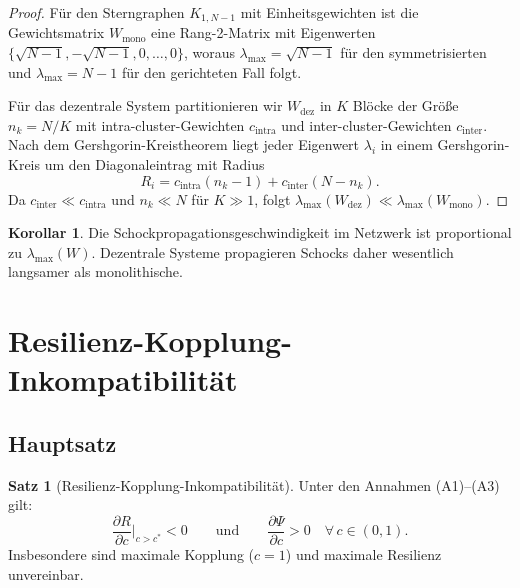 \documentclass[a4paper, 12pt, twoside, openright]{report}
\theoremstyle{definition}
\theoremstyle{definition}
\newtheorem{satz}{Satz}[chapter]
\newtheorem{korollar}{Korollar}[chapter]
\begin{document}
\begin{proof}
    Für den Sterngraphen $K_{1,N-1}$ mit Einheitsgewichten ist die Gewichtsmatrix
    $W_{\text{mono}}$ eine Rang-2-Matrix mit Eigenwerten
    $\{\sqrt{N-1}, -\sqrt{N-1}, 0, \ldots, 0\}$, woraus $\lambda_{\max} = \sqrt{N-1}$
    für den symmetrisierten und $\lambda_{\max} = N-1$ für den gerichteten Fall folgt.
    
    Für das dezentrale System partitionieren wir $W_{\text{dez}}$ in $K$ Blöcke der Größe
    $n_k = N/K$ mit intra-cluster-Gewichten $c_{\text{intra}}$ und inter-cluster-Gewichten
    $c_{\text{inter}}$. Nach dem Gershgorin-Kreistheorem liegt jeder Eigenwert $\lambda_i$
    in einem Gershgorin-Kreis um den Diagonaleintrag mit Radius
    \[
        R_i = c_{\text{intra}}(n_k - 1) + c_{\text{inter}}(N - n_k).
    \]
    Da $c_{\text{inter}} \ll c_{\text{intra}}$ und $n_k \ll N$ für $K \gg 1$, folgt
    $\lambda_{\max}(W_{\text{dez}}) \ll \lambda_{\max}(W_{\text{mono}})$.
\end{proof}

\begin{korollar}
    Die Schockpropagationsgeschwindigkeit im Netzwerk ist proportional zu
    $\lambda_{\max}(W)$. Dezentrale Systeme propagieren Schocks daher wesentlich
    langsamer als monolithische.
\end{korollar}

\section{Resilienz-Kopplung-Inkompatibilität}

\subsection{Hauptsatz}

\begin{satz}[Resilienz-Kopplung-Inkompatibilität]
\label{satz:rki}
    Unter den Annahmen (A1)--(A3) gilt:
    \[
        \frac{\partial R}{\partial c}\bigg|_{c > c^*} < 0
        \qquad\text{und}\qquad
        \frac{\partial \Psi}{\partial c} > 0 \quad \forall\, c \in (0,1).
    \]
    Insbesondere sind maximale Kopplung ($c = 1$) und maximale Resilienz unvereinbar.
\end{satz}
\end{document}
